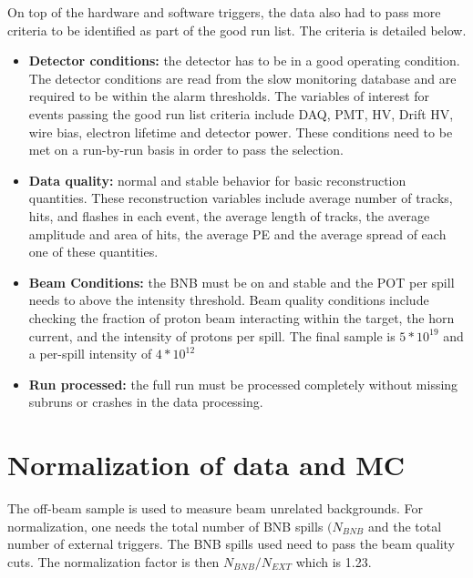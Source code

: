 On top of the hardware and software triggers, the data also had to pass more criteria to be identified as part of the good run list. The criteria is detailed below.
\begin{itemize}
\item{\textbf{Detector conditions:} the detector has to be in a good operating condition. The detector conditions are read from the slow monitoring database and are required to be within the alarm thresholds. The variables of interest for events passing the good run list criteria include DAQ, PMT, HV, Drift HV, wire bias, electron lifetime and detector power. These conditions need to be met on a run-by-run basis in order to pass the selection.}
\item{\textbf{Data quality:} normal and stable behavior for basic reconstruction quantities. These reconstruction variables include average number of tracks, hits, and flashes in each event, the average length of tracks, the average amplitude and area of hits, the average PE and the average spread of each one of these quantities.}
\item{\textbf{Beam Conditions:} the BNB must be on and stable and the POT per spill needs to above the intensity threshold. Beam quality conditions include checking the fraction of proton beam interacting within the target, the horn current, and the intensity of protons per spill. The final sample is $5 * 10^{19}$ and a per-spill intensity of $4 * 10^{12}$}
\item{\textbf{Run processed:} the full run must be processed completely without missing subruns or crashes in the data processing.}
\end{itemize}

\section{Normalization of data and MC}\label{section:normalize}
The off-beam sample is used to measure beam unrelated backgrounds. For normalization, one needs the total number of BNB spills \textit{$(N_{BNB}$} and the total number of external triggers. The BNB spills used need to pass the beam quality cuts. The normalization factor is then \textit{$N_{BNB}/N_{EXT}$} which is 1.23. 

